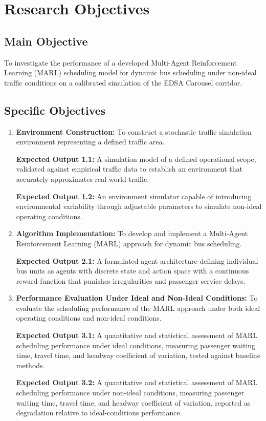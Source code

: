 \section{Research Objectives}
\subsection{Main Objective}
To investigate the performance of a developed Multi-Agent Reinforcement Learning (MARL) scheduling model for dynamic bus scheduling under non-ideal traffic conditions on a calibrated simulation of the EDSA Carousel corridor.

\subsection{Specific Objectives}
\begin{enumerate}
   \item \textbf{Environment Construction:} To construct a stochastic traffic simulation environment representing a defined traffic area.

   \textbf{Expected Output 1.1:} A simulation model of a defined operational scope, validated against empirical traffic data to establish an environment that accurately approximates real-world traffic.

   \textbf{Expected Output 1.2:} An environment simulator capable of introducing environmental variability through adjustable parameters to simulate non-ideal operating conditions.

   \item \textbf{Algorithm Implementation:} To develop and implement a Multi-Agent Reinforcement Learning (MARL) approach for dynamic bus scheduling.

   \textbf{Expected Output 2.1:} A formulated agent architecture defining individual bus units as agents with discrete state and action space with a continuous reward function that punishes irregularities and passenger service delays.

   \item \textbf{Performance Evaluation Under Ideal and Non-Ideal Conditions:} To evaluate the scheduling performance of the MARL approach under both ideal operating conditions and non-ideal conditions.

   \textbf{Expected Output 3.1:} A quantitative and statistical assessment of MARL scheduling performance under ideal conditions, measuring passenger waiting time, travel time, and headway coefficient of variation, tested against baseline methods.

   \textbf{Expected Output 3.2:} A quantitative and statistical assessment of MARL scheduling performance under non-ideal conditions, measuring passenger waiting time, travel time, and headway coefficient of variation, reported as degradation relative to ideal-conditions performance.
\end{enumerate}


